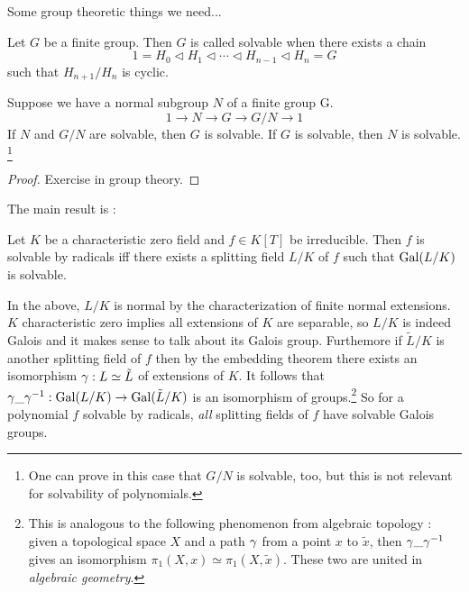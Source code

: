 \documentclass{article}
\begin{document}
Some group theoretic things we need... 

\begin{dfn}
  
  Let $G$ be a finite group.
  Then $G$ is called solvable when
  there exists a chain \[
    1 = H_0 \triangleleft H_1 \triangleleft
    \cdots \triangleleft H_{n-1} \triangleleft H_n = G
  \]
  such that $H_{n+1} / H_n$ is cyclic.
\end{dfn}

\begin{prop}
  
  Suppose we have a normal subgroup $N$ of a finite group G.
  \[
    1 \to N \to G \to G / N \to 1
  \]
  If $N$ and $G / N$ are solvable, then $G$ is solvable.
  If $G$ is solvable, then $N$ is solvable.
  \footnote{
    One can prove in this case that $G / N$ is solvable, too,
    but this is not relevant for solvability of polynomials.
  }
\end{prop}
\begin{proof}
  Exercise in group theory.
\end{proof}

The main result is : 
\begin{prop}
  
  Let $K$ be a characteristic zero field and $f \in K[T]$ be irreducible.
  Then $f$ is solvable by radicals iff 
  there exists a splitting field $L / K$ of $f$
  such that $\operatorname{Gal}(L / K)$ is solvable.
\end{prop}

\begin{rmk}
  In the above,
  $L / K$ is normal by the characterization of finite normal extensions.
  $K$ characteristic zero implies all extensions of $K$ are separable, 
  so $L / K$ is indeed Galois and it makes sense to talk about its Galois group.
  Furthemore if $\tilde{L} / K$ is another splitting field of $f$ then
  by the embedding theorem there exists an isomorphism $\gamma : L \simeq \tilde{L}$
  of extensions of $K$.
  It follows that $\gamma \_ \gamma^{-1} : \operatorname{Gal}(L / K) \to \operatorname{Gal}(\tilde{L} / K)$
  is an isomorphism of groups.\footnote{
    This is analogous to the following phenomenon from algebraic topology : 
    given a topological space $X$ and a path $\gamma$ from
    a point $x$ to $\tilde{x}$,
    then $\gamma \_ \gamma^{-1}$ gives an isomorphism 
    $\pi_1(X , x) \simeq \pi_1(X , \tilde{x})$.
    These two are united in \emph{algebraic geometry}.
  }
  So for a polynomial $f$ solvable by radicals,
  \emph{all} splitting fields of $f$ have solvable Galois groups.
\end{rmk}
\end{document}
